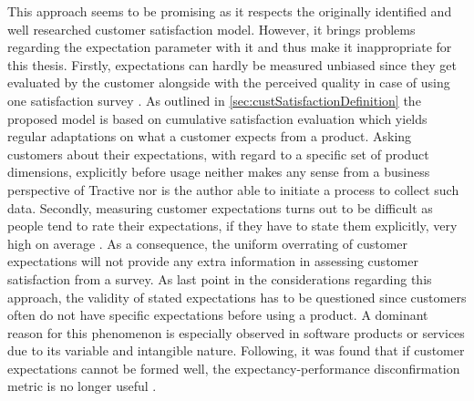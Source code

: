 This approach seems to be promising as it respects the originally identified and well researched customer satisfaction model. However, it brings problems regarding the expectation parameter with it and thus make it inappropriate for this thesis. Firstly, expectations can hardly be measured unbiased since they get evaluated by the customer alongside with the perceived quality in case of using one satisfaction survey \cite{getty1995relationship}. As outlined in \ref{sec:custSatisfactionDefinition} the proposed model is based on cumulative satisfaction evaluation which yields regular adaptations on what a customer expects from a product. Asking customers about their expectations, with regard to a specific set of product dimensions, explicitly before usage neither makes any sense from a business perspective of Tractive nor is the author able to initiate a process to collect such data. Secondly, measuring customer expectations turns out to be difficult as people tend to rate their expectations, if they have to state them explicitly, very high on average \cite{babakus1992empirical}. As a consequence, the uniform overrating of customer expectations will not provide any extra information in assessing customer satisfaction from a survey. As last point in the considerations regarding this approach, the validity of stated expectations has to be questioned since customers often do not have specific expectations before using a product. A dominant reason for this phenomenon is especially observed in software products or services due to its variable and intangible nature. Following, it was found that if customer expectations cannot be formed well, the expectancy-performance disconfirmation metric is no longer useful \cite{halstead1994multisource}. 

